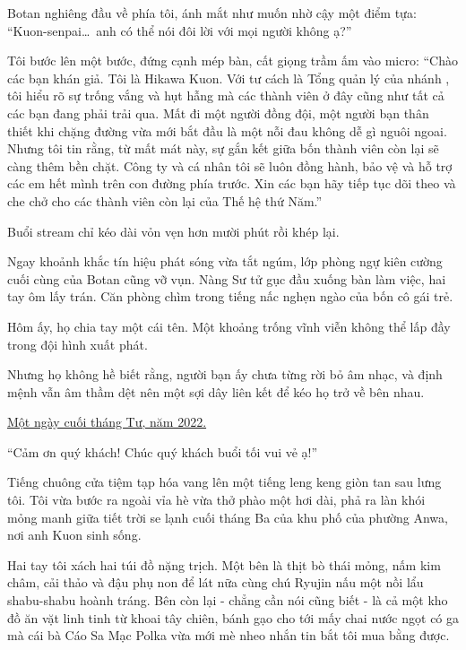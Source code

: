 \documentclass[../main.tex]{subfiles}
\begin{document}
Botan nghiêng đầu về phía tôi, ánh mắt như muốn nhờ cậy một điểm tựa: ``Kuon-senpai\dots\ anh có thể nói đôi lời với mọi người không ạ?''

Tôi bước lên một bước, đứng cạnh mép bàn, cất giọng trầm ấm vào micro: ``Chào các bạn khán giả. Tôi là Hikawa Kuon. Với tư cách là Tổng quản lý của nhánh \hll, tôi hiểu rõ sự trống vắng và hụt hẫng mà các thành viên ở đây cũng như tất cả các bạn đang phải trải qua. Mất đi một người đồng đội, một người bạn thân thiết khi chặng đường vừa mới bắt đầu là một nỗi đau không dễ gì nguôi ngoai. Nhưng tôi tin rằng, từ mất mát này, sự gắn kết giữa bốn thành viên còn lại sẽ càng thêm bền chặt. Công ty và cá nhân tôi sẽ luôn đồng hành, bảo vệ và hỗ trợ các em hết mình trên con đường phía trước. Xin các bạn hãy tiếp tục dõi theo và che chở cho các thành viên còn lại của Thế hệ thứ Năm.''

Buổi stream chỉ kéo dài vỏn vẹn hơn mười phút rồi khép lại.

Ngay khoảnh khắc tín hiệu phát sóng vừa tắt ngúm, lớp phòng ngự kiên cường cuối cùng của Botan cũng vỡ vụn. Nàng Sư tử gục đầu xuống bàn làm việc, hai tay ôm lấy trán. Căn phòng chìm trong tiếng nấc nghẹn ngào của bốn cô gái trẻ.

Hôm ấy, họ chia tay một cái tên. Một khoảng trống vĩnh viễn không thể lấp đầy trong đội hình xuất phát.

Nhưng họ không hề biết rằng, người bạn ấy chưa từng rời bỏ âm nhạc, và định mệnh vẫn âm thầm dệt nên một sợi dây liên kết để kéo họ trở về bên nhau.

\begin{center}
    \uline{Một ngày cuối tháng Tư, năm 2022.}
\end{center}


``Cảm ơn quý khách! Chúc quý khách buổi tối vui vẻ ạ!''

Tiếng chuông cửa tiệm tạp hóa vang lên một tiếng leng keng giòn tan sau lưng tôi. Tôi vừa bước ra ngoài vỉa hè vừa thở phào một hơi dài, phả ra làn khói mỏng manh giữa tiết trời se lạnh cuối tháng Ba của khu phố của phường Anwa, nơi anh Kuon sinh sống.

Hai tay tôi xách hai túi đồ nặng trịch. Một bên là thịt bò thái mỏng, nấm kim châm, cải thảo và đậu phụ non để lát nữa cùng chú Ryujin nấu một nồi lẩu shabu-shabu hoành tráng. Bên còn lại - chẳng cần nói cũng biết - là cả một kho đồ ăn vặt linh tinh từ khoai tây chiên, bánh gạo cho tới mấy chai nước ngọt có ga mà cái bà Cáo Sa Mạc Polka vừa mới mè nheo nhắn tin bắt tôi mua bằng được.
\end{document}
